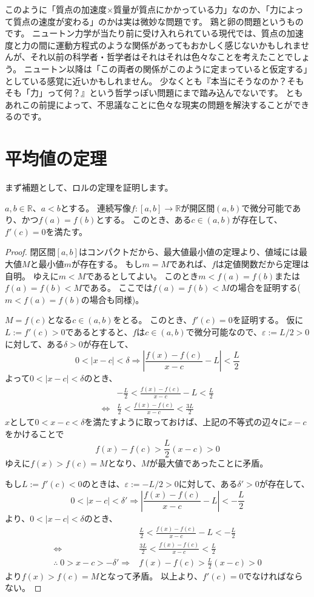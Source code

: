 このように「質点の加速度×質量が質点にかかっている力」なのか、「力によって質点の速度が変わる」のかは実は微妙な問題です。
鶏と卵の問題というものです。
ニュートン力学が当たり前に受け入れられている現代では、質点の加速度と力の間に運動方程式のような関係があってもおかしく感じないかもしれませんが、それ以前の科学者・哲学者はそれはそれは色々なことを考えたことでしょう。
ニュートン以降は「この両者の関係がこのように定まっていると仮定する」としている感覚に近いかもしれません。
少なくとも『本当にそうなのか？そもそも「力」って何？』という哲学っぽい問題にまで踏み込んでないです。
ともあれこの前提によって、不思議なことに色々な現実の問題を解決することができるのです。



\section{平均値の定理}\label{sec:mean-value-theorem}

まず補題として、ロルの定理を証明します。
\begin{theorem}[ロルの定理]
  $a,b\in\mathbb{R}$、$a<b$とする。
  連続写像$f:[a,b]\to\mathbb{R}$が開区間$(a,b)$で微分可能であり、かつ$f(a)=f(b)$とする。
  このとき、ある$c\in(a,b)$が存在して、$f'(c)=0$を満たす。
\end{theorem}
\begin{proof}
  閉区間$[a,b]$はコンパクトだから、最大値最小値の定理より、値域には最大値$M$と最小値$m$が存在する。
  もし$m=M$であれば、$f$は定値関数だから定理は自明。
  ゆえに$m<M$であるとしてよい。
  このとき$m<f(a)=f(b)$または$f(a)=f(b)<M$である。
  ここでは$f(a)=f(b)<M$の場合を証明する($m<f(a)=f(b)$の場合も同様)。

  $M=f(c)$となる$c\in(a,b)$をとる。
  このとき、$f'(c)=0$を証明する。
  仮に$L:=f'(c)>0$であるとすると、$f$は$c\in(a,b)$で微分可能なので、$\varepsilon:=L/2>0$に対して、ある$\delta>0$が存在して、
  \[
    0<|x-c|<\delta\Rightarrow\left|\frac{f(x)-f(c)}{x-c}-L\right|<\frac{L}{2}
  \]
  よって$0<|x-c|<\delta$のとき、
  \begin{align*}
    &-\frac{L}{2}<\frac{f(x)-f(c)}{x-c}-L<\frac{L}{2}\\
    \iff&\frac{L}{2}<\frac{f(x)-f(c)}{x-c}<\frac{3L}{2}
  \end{align*}
  $x$として$0<x-c<\delta$を満たすように取っておけば、上記の不等式の辺々に$x-c$をかけることで
  \[
    f(x)-f(c)>\frac{L}{2}(x-c)>0
  \]
  ゆえに$f(x)>f(c)=M$となり、$M$が最大値であったことに矛盾。

  もし$L:=f'(c)<0$のときは、$\varepsilon:=-L/2>0$に対して、ある$\delta'>0$が存在して、
  \[
    0<|x-c|<\delta'\Rightarrow\left|\frac{f(x)-f(c)}{x-c}-L\right|<-\frac{L}{2}
  \]
  より、$0<|x-c|<\delta$のとき、
  \begin{align*}
    &\frac{L}{2}<\frac{f(x)-f(c)}{x-c}-L<-\frac{L}{2}\\
    \iff&\frac{3L}{2}<\frac{f(x)-f(c)}{x-c}<\frac{L}{2}\\
    \therefore\;0>x-c>-\delta'\Rightarrow& f(x)-f(c)>\frac{L}{2}(x-c)>0
  \end{align*}
  より$f(x)>f(c)=M$となって矛盾。
  以上より、$f'(c)=0$でなければならない。
\end{proof}

